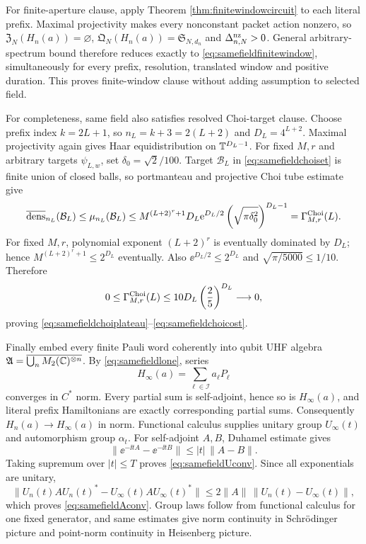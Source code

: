 For finite-aperture clause, apply Theorem
\ref{thm:finitewindowcircuit} to each literal prefix.  Maximal projectivity
makes every nonconstant packet action nonzero, so
$\mathfrak Z_N(H_n(a))=\varnothing$,
$\mathfrak Q_N(H_n(a))=\mathfrak S_{N,d_n}$ and
$\Delta_{n,N}^{\rm nz}>0$.  General arbitrary-spectrum bound therefore
reduces exactly to \eqref{eq:samefieldfinitewindow}, simultaneously for every
prefix, resolution, translated window and positive duration.  This proves
finite-window clause without adding assumption to selected field.

For completeness, same field also satisfies resolved Choi-target clause.
Choose prefix index $k=2L+1$, so $n_L=k+3=2(L+2)$ and
$D_L=4^{L+2}$.  Maximal projectivity again gives Haar equidistribution on
$\mathbb T^{D_L-1}$.  For fixed $M,r$ and arbitrary targets $\psi_{L,w}$, set
$\delta_0=\sqrt2/100$.  Target $\mathcal B_L$ in
\eqref{eq:samefieldchoiset} is finite union of closed balls, so portmanteau
and projective Choi tube estimate give
\[
 \overline{\operatorname{dens}}_{n_L}(\mathcal B_L)
 \le\mu_{n_L}(\mathcal B_L)
 \le M^{(L+2)^r+1}D_L\mathrm e^{D_L/2}
 \left(\sqrt{\pi\delta_0^2}\right)^{D_L-1}
 =\Gamma^{\rm Choi}_{M,r}(L).
\]
For fixed $M,r$, polynomial exponent $(L+2)^r$ is eventually dominated by
$D_L$; hence $M^{(L+2)^r+1}\le2^{D_L}$ eventually.  Also
$\ee^{D_L/2}\le2^{D_L}$ and $\sqrt{\pi/5000}\le1/10$.  Therefore
\[
 0\le\Gamma^{\rm Choi}_{M,r}(L)
 \le10D_L\left(\frac25\right)^{D_L}\longrightarrow0,
\]
proving \eqref{eq:samefieldchoiplateau}--\eqref{eq:samefieldchoicost}.

Finally embed every finite Pauli word coherently into qubit UHF algebra
$\mathfrak A=\overline{\bigcup_n M_2(\mathbb C)^{\otimes n}}$.  By
\eqref{eq:samefieldlone}, series
\begin{equation}
 H_\infty(a)=\sum_{\ell\in\mathcal I}a_\ell P_\ell   \label{eq:samefieldHinftyproof}
\end{equation}
converges in $C^*$ norm.  Every partial sum is self-adjoint, hence so is
$H_\infty(a)$, and literal prefix Hamiltonians are exactly corresponding
partial sums.  Consequently $H_n(a)\to H_\infty(a)$ in norm.  Functional
calculus supplies unitary group $U_\infty(t)$ and automorphism group
$\alpha_t$.  For self-adjoint $A,B$, Duhamel estimate gives
\begin{equation}
 \|\ee^{-\ii tA}-\ee^{-\ii tB}\|
 \le |t|\,\|A-B\|.                                  \label{eq:samefieldduhamel}
\end{equation}
Taking supremum over $|t|\le T$ proves
\eqref{eq:samefieldUconv}.  Since all exponentials are unitary,
\begin{equation}
 \|U_n(t)AU_n(t)^*-U_\infty(t)AU_\infty(t)^*\|
 \le2\|A\|\,\|U_n(t)-U_\infty(t)\|,                 \label{eq:samefieldheisenberg}
\end{equation}
which proves \eqref{eq:samefieldAconv}.  Group laws follow from functional
calculus for one fixed generator, and same estimates give norm continuity in
Schr\"odinger picture and point-norm continuity in Heisenberg picture.

